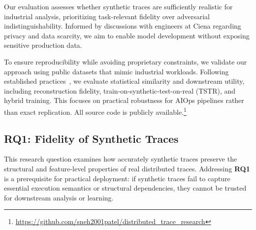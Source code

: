 \documentclass[sigconf,review]{acmart}
\begin{document}
Our evaluation assesses whether synthetic traces are sufficiently realistic for industrial analysis, prioritizing task-relevant fidelity over adversarial indistinguishability. Informed by discussions with engineers at Ciena regarding privacy and data scarcity, we aim to enable model development without exposing sensitive production data. 

To ensure reproducibility while avoiding proprietary constraints, we validate our approach using public datasets that mimic industrial workloads. Following established practices~\cite{esteban2017real,goncalves2020generation}, we evaluate statistical similarity and downstream utility, including reconstruction fidelity, train-on-synthetic-test-on-real (TSTR), and hybrid training. This focuses on practical robustness for AIOps pipelines rather than exact replication. All source code is publicly available.\footnote{\url{https://github.com/sneh2001patel/distributed_trace_research}}




\subsection{RQ1: Fidelity of Synthetic Traces}
\label{sec:rq1}

This research question examines how accurately synthetic traces preserve the structural and feature-level properties of real distributed traces. Addressing \textbf{RQ1} is a prerequisite for practical deployment: if synthetic traces fail to capture essential execution semantics or structural dependencies, they cannot be trusted for downstream analysis or learning.
\end{document}
